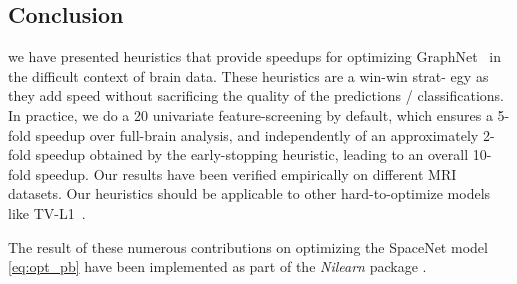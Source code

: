 \subsection{Conclusion}
we have presented heuristics that provide
speedups for optimizing GraphNet~\citep{hebiri2011,grosenick2013}  in the difficult
context of brain data. These heuristics are a win-win strat-
egy as they add speed without sacrificing the quality of
the predictions / classifications. In practice, we do a 20%
univariate feature-screening by default, which ensures a 5-
fold speedup over full-brain analysis, and independently of an
approximately 2-fold speedup obtained by the early-stopping
heuristic, leading to an overall 10-fold speedup. Our results
have been verified empirically on different MRI datasets. Our heuristics should
be applicable to other hard-to-optimize models like TV-L1~\citep{baldassarre2012,gramfort2013}.

The result of these numerous contributions on optimizing the SpaceNet model
\eqref{eq:opt_pb} have been implemented as part of the \textit{Nilearn} package
\citep{nilearn}.






